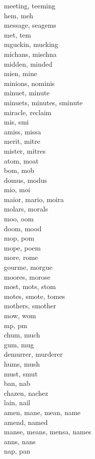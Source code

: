 meeting, teeming\\
hem, meh\\
message, seagems\\
met, tem\\
mguckin, mucking\\
michans, mischna\\
midden, minded\\
mien, mine\\
minions, nominis\\
minuet, minute\\
minuets, minutes, sminute\\
miracle, reclaim\\
mis, smi\\
amiss, missa\\
merit, mitre\\
mister, mitres\\
atom, moat\\
bom, mob\\
domus, modus\\
mio, moi\\
maior, mario, moira\\
molars, morals\\
moo, oom\\
doom, mood\\
mop, pom\\
mope, poem\\
more, rome\\
gourme, morgue\\
moores, morose\\
most, mots, stom\\
motes, smote, tomes\\
mothers, smother\\
mow, wom\\
mp, pm\\
chum, much\\
gum, mug\\
demurrer, murderer\\
hums, mush\\
must, smut\\
ban, nab\\
chazen, nachez\\
lain, nail\\
amen, mane, mean, name\\
amend, named\\
manse, means, mensa, names\\
anns, nans\\
nap, pan\\
